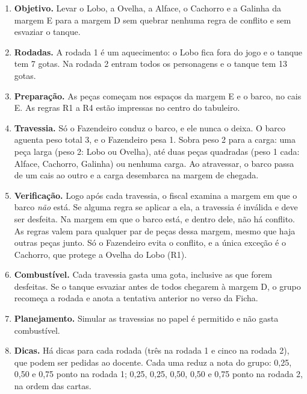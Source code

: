 \documentclass[12pt,a4paper]{article}
\begin{document}
\begin{enumerate}[label=\arabic*.]
  \item \textbf{Objetivo.} Levar o Lobo, a Ovelha, a Alface, o Cachorro e a
        Galinha da margem E para a margem D sem quebrar nenhuma regra de
        conflito e sem esvaziar o tanque.
  \item \textbf{Rodadas.} A rodada 1 é um aquecimento: o Lobo fica fora do jogo e
        o tanque tem 7 gotas. Na rodada 2 entram todos os personagens e o
        tanque tem 13 gotas.
  \item \textbf{Preparação.} As peças começam nos espaços da margem E e o barco,
        no cais E. As regras R1 a R4 estão impressas no centro do tabuleiro.
  \item \textbf{Travessia.} Só o Fazendeiro conduz o barco, e ele nunca o deixa.
        O barco aguenta peso total 3, e o Fazendeiro pesa 1. Sobra peso 2 para
        a carga: uma peça larga (peso 2: Lobo ou Ovelha), até duas peças
        quadradas (peso 1 cada: Alface, Cachorro, Galinha) ou nenhuma carga. Ao
        atravessar, o barco passa de um cais ao outro e a carga desembarca na
        margem de chegada.
  \item \textbf{Verificação.} Logo após cada travessia, o fiscal examina a
        margem em que o barco \emph{não} está. Se alguma regra se aplicar a
        ela, a travessia é inválida e deve ser desfeita. Na margem em que o
        barco está, e dentro dele, não há conflito. As regras valem para
        qualquer par de peças dessa margem, mesmo que haja outras peças junto.
        Só o Fazendeiro evita o conflito, e a única exceção é o Cachorro, que
        protege a Ovelha do Lobo (R1).
  \item \textbf{Combustível.} Cada travessia gasta uma gota, inclusive as que
        forem desfeitas. Se o tanque esvaziar antes de todos chegarem à margem
        D, o grupo recomeça a rodada e anota a tentativa anterior no verso da
        Ficha.
  \item \textbf{Planejamento.} Simular as travessias no papel é permitido e não
        gasta combustível.
  \item \textbf{Dicas.} Há dicas para cada rodada (três na rodada 1 e cinco na
        rodada 2), que podem ser pedidas ao docente. Cada uma reduz a nota do
        grupo: 0,25, 0,50 e 0,75 ponto na rodada 1; 0,25, 0,25, 0,50, 0,50 e
        0,75 ponto na rodada 2, na ordem das cartas.
\end{enumerate}

\end{document}
